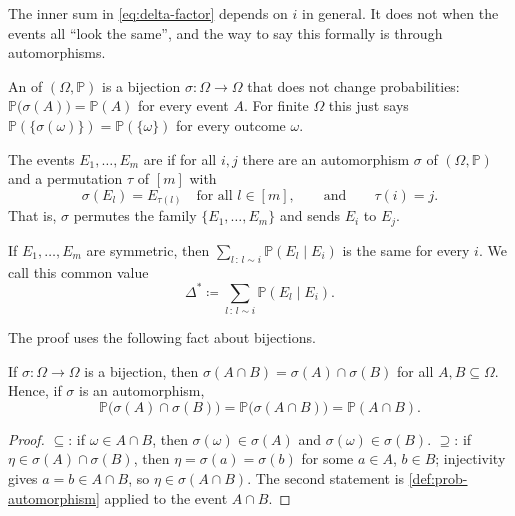 The inner sum in \eqref{eq:delta-factor} depends on \(i\) in general. It does not when the events all ``look the same'', and the way to say this formally is through automorphisms.

\begin{definition}\label{def:prob-automorphism}
    An  of \((\Omega, \mathbb{P})\) is a bijection \(\sigma \colon \Omega \to \Omega\) that does not change probabilities: \(\mathbb{P}\bigl( \sigma(A) \bigr) = \mathbb{P}(A)\) for every event \(A\). For finite \(\Omega\) this just says \(\mathbb{P}(\{\sigma(\omega)\}) = \mathbb{P}(\{\omega\})\) for every outcome \(\omega\).
\end{definition}

\begin{definition}\label{def:delta-star}
    The events \(E_1, \ldots, E_m\) are  if for all \(i, j\) there are an automorphism \(\sigma\) of \((\Omega, \mathbb{P})\) and a permutation \(\tau\) of \([m]\) with
    \[
        \sigma(E_l) = E_{\tau(l)} \quad \text{for all } l \in [m],
        \qquad\text{and}\qquad
        \tau(i) = j .
    \]
    That is, \(\sigma\) permutes the family \(\{E_1, \ldots, E_m\}\) and sends \(E_i\) to \(E_j\).
\end{definition}

\begin{lemma}\label{lem:delta-star-const}
    If \(E_1, \ldots, E_m\) are symmetric, then \(\sum_{l \,:\, l \sim i} \mathbb{P}(E_l \mid E_i)\) is the same for every \(i\). We call this common value
    \[
        \Delta^{*} \coloneqq \sum_{l \,:\, l \sim i} \mathbb{P}(E_l \mid E_i).
    \]
\end{lemma}

The proof uses the following fact about bijections.

\begin{claim}\label{claim:bijection-cap}
    If \(\sigma \colon \Omega \to \Omega\) is a bijection, then \(\sigma(A \cap B) = \sigma(A) \cap \sigma(B)\) for all \(A, B \subseteq \Omega\). Hence, if \(\sigma\) is an automorphism,
    \[
        \mathbb{P}\bigl( \sigma(A) \cap \sigma(B) \bigr) = \mathbb{P}\bigl( \sigma(A \cap B) \bigr) = \mathbb{P}(A \cap B).
    \]
\end{claim}
\begin{proof}
    \(\subseteq\): if \(\omega \in A \cap B\), then \(\sigma(\omega) \in \sigma(A)\) and \(\sigma(\omega) \in \sigma(B)\). \(\supseteq\): if \(\eta \in \sigma(A) \cap \sigma(B)\), then \(\eta = \sigma(a) = \sigma(b)\) for some \(a \in A\), \(b \in B\); injectivity gives \(a = b \in A \cap B\), so \(\eta \in \sigma(A \cap B)\). The second statement is \autoref{def:prob-automorphism} applied to the event \(A \cap B\).
\end{proof}

